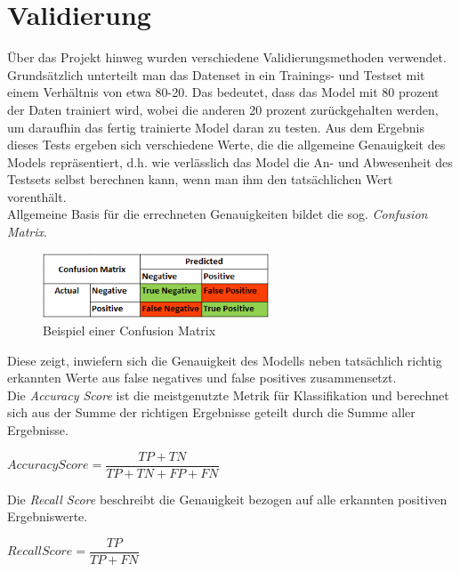 \section{Validierung}
\sloppy
Über das Projekt hinweg wurden verschiedene Validierungsmethoden verwendet. Grundsätzlich unterteilt man das 
Datenset in ein Trainings- und Testset mit einem Verhältnis von etwa 80-20. Das bedeutet, dass das Model mit
80 prozent der Daten trainiert wird, wobei die anderen 20 prozent zurückgehalten werden, um daraufhin das 
fertig trainierte Model daran zu testen. Aus dem Ergebnis dieses Tests ergeben sich verschiedene Werte, die  
die allgemeine Genauigkeit des Models repräsentiert, d.h. wie verlässlich das Model die An- und Abwesenheit 
des Testsets selbst berechnen kann, wenn man ihm den tatsächlichen Wert vorenthält.\\
Allgemeine Basis für die errechneten Genauigkeiten bildet die sog. \textit{Confusion Matrix}.

\begin{figure}[h]
    \centering
    \includegraphics[width=0.6\textwidth]{pic/confusion_matrix_ex.png}
    \caption{Beispiel einer Confusion Matrix}
    \label{fig:CV}
\end{figure}

Diese zeigt, inwiefern sich die Genauigkeit des Modells neben tatsächlich richtig erkannten Werte aus 
false negatives und false positives zusammensetzt.\\
Die \textit{Accuracy Score} ist die meistgenutzte Metrik für Klassifikation und berechnet sich aus der 
Summe der richtigen Ergebnisse geteilt durch die Summe aller Ergebnisse.

\begin{center}
    $AccuracyScore = \dfrac{TP + TN}{TP + TN + FP + FN}$    
\end{center}
Die \textit{Recall Score} beschreibt die Genauigkeit bezogen auf alle erkannten positiven Ergebniswerte. 
\begin{center}
    $RecallScore = \dfrac{TP}{TP + FN}$    
\end{center}

